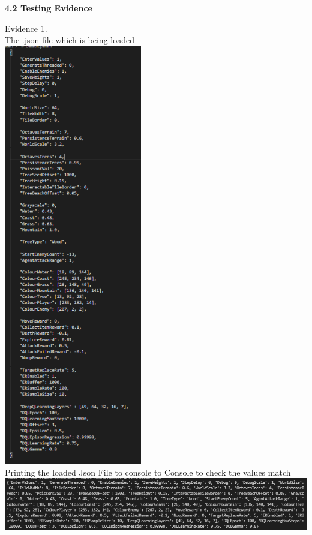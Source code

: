 \begin{flushleft}
    \pagebreak
    \vspace{1cm}
    \Large{\textbf{4.2 Testing Evidence}}
    
    \vspace{0.5cm}

    \setcounter{magicrownumbers}{0}
    \normalsize
    \begin{center}
        {\large Evidence 1.\rn }\\ 
        \vspace{0.3cm}
        The .json file which is being loaded \\
        \includegraphics[width=6cm]{Images/Testing/T1.1.1.PNG} \\
        Printing the loaded Json File to console to Console to check the values match\\
        \includegraphics[width=16cm]{Images/Testing/T1.1.2.PNG} \\
        \vspace{1cm}


\end{center}
\end{flushleft}
